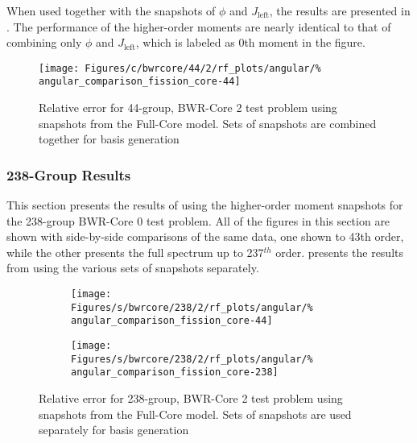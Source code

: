 When used together with the snapshots of $\phi$ and $J_{\text{left}}$, the 
results are presented in .  The 
performance of the higher-order moments are nearly identical to that of 
combining only $\phi$ and $J_{\text{left}}$, which is labeled as 0th moment in 
the figure.

\begin{figure*}[tb]
    \centering
    \texttt{[image: Figures/c/bwrcore/44/2/rf\_plots/angular/\%
        angular\_comparison\_fission\_core-44]}
    \caption{Relative error for 44-group, BWR-Core 2 test problem using 
        snapshots from the Full-Core model.  Sets of snapshots are combined 
        together for basis generation}
    \label{fig:BWR2-core-combined}
\end{figure*}

\subsubsection{238-Group Results}

This section presents the results of using the higher-order moment snapshots 
for the 238-group BWR-Core 0 test problem.  All of the figures in 
this section are shown with side-by-side comparisons of the same data, one 
shown to 43th order, while the other presents the full spectrum up to 
237$^{th}$ order.   presents the results 
from using the various sets of snapshots separately.

\begin{figure*}[tb]
    \centering
    \begin{subfigure}{0.5\textwidth}
        \centering
        \texttt{[image: Figures/s/bwrcore/238/2/rf\_plots/angular/\%
            angular\_comparison\_fission\_core-44]}
    \end{subfigure}%
    \begin{subfigure}{0.5\textwidth}
        \centering
        \texttt{[image: Figures/s/bwrcore/238/2/rf\_plots/angular/\%
            angular\_comparison\_fission\_core-238]}
    \end{subfigure}
    \caption{Relative error for 238-group, BWR-Core 2 test problem using 
        snapshots from the Full-Core model.  Sets of snapshots are 
        used separately for basis generation}
    \label{fig:BWR2-core-single-238}
\end{figure*}

